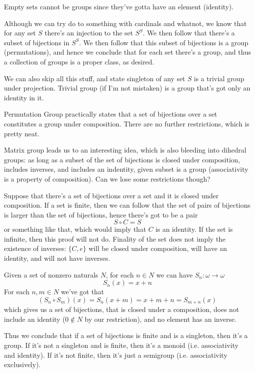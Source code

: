 \documentclass[11pt,oneside,titlepage]{book}
\newcommand{\set}[1]{\{ #1 \}}
\begin{document}
Empty sets cannot be groups since they've gotta have an element
(identity).

Although we can try do to something with cardinals and whatnot, we
know that for any set $S$ there's an injection to the set $S^S$. We
then follow that there's a subset of bijections in $S^S$. We then
follow that this subset of bijections is a group (permutations), and
hence we conclude that for each set there's a group, and thus a
collection of groups is a proper class, as desired.

We can also skip all this stuff, and state singleton of any set $S$ is
a trivial group under projection. Trivial group (if I'm not mistaken)
is a group that's got only an identity in it.

Permutation Group practically states that a set of bijections over a
set constitutes a group under composition. There are no further
restrictions, which is pretty neat.

Matrix group leads us to an interesting idea, which is also bleeding
into dihedral groups: as long as a subset of the set of bijections is
closed under composition, includes inverses, and includes an
indentity, given subset is a group (associativity is a property of
composition). Can we lose some restrictions though?

Suppose that there's a set of bijections over a set and it is closed
under composition. If a set is finite, then we can follow that the set
of pairs of bijections is larger than the set of bijections, hence
there's got to be a pair
$$S \circ C = S$$
or something like that, which would imply that $C$ is an identity.  If
the set is infinite, then this proof will not do.  Finality of the set
does not imply the existence of inverses: $\set{C, e}$ will be closed
under composition, will have an identity, and will not have inverses.

Given a set of nonzero naturals $N$, for each $n \in N$ we can have
$S_n: \omega \to \omega$
$$S_n(x) = x + n$$
For each $n, m \in N$ we've got that
$$(S_n \circ S_m)(x) = S_n(x + m) = x + m + n = S_{m + n}(x)$$
which gives us a set of bijections, that is closed under a
composition, does not include an identity ($0 \notin N$ by our
restriction), and no element has an inverse.

Thus we conclude that if a set of bijections is finite and is a
singleton, then it's a group.  If it's not a singleton and is finite,
then it's a monoid (i.e. associativity and identity).  If it's not
finite, then it's just a semigroup (i.e. associativity exclusively).
\end{document}
